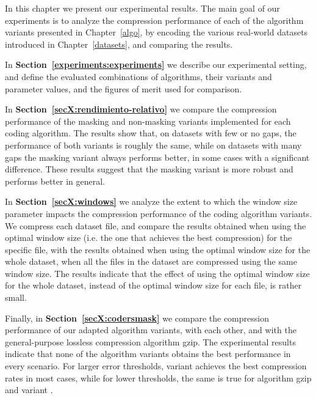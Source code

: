 






In this chapter we present our experimental results. The main goal of our experiments is to analyze the compression performance of each of the algorithm variants presented in Chapter~\ref{algo}, by encoding the various real-world datasets introduced in Chapter~\ref{datasets}, and comparing the results.

In \textbf{Section~\ref{experiments:experiments}} we describe our experimental setting, and define the evaluated combinations of algorithms, their variants and parameter values, and the figures of merit used for comparison. 

In \textbf{Section~\ref{secX:rendimiento-relativo}} we compare the compression performance of the masking and non-masking variants implemented for each coding algorithm. The results show that, on datasets with few or no gaps, the performance of both variants is roughly the same, while on datasets with many gaps the masking variant always performs better, in some cases with a significant difference. These results suggest that the masking variant is more robust and performs better in general. 

In \textbf{Section~\ref{secX:windows}} we analyze the extent to which the window size parameter impacts the compression performance of the coding algorithm variants. We compress each dataset file, and compare the results obtained when using the optimal window size (i.e. the one that achieves the best compression) for the specific file, with the results obtained when using the optimal window size for the whole dataset, when all the files in the dataset are compressed using the same window size. The results indicate that the effect of using the optimal window size for the whole dataset, instead of the optimal window size for each file, is rather small. 

Finally, in \textbf{Section~\ref{secX:codersmask}} we compare the compression performance of our adapted algorithm variants, with each other, and with the general-purpose lossless compression algorithm gzip. The experimental results indicate that none of the algorithm variants obtains the best performance in every scenario. For larger error thresholds, variant  achieves the best compression rates in most cases, while for lower thresholds, the same is true for algorithm gzip and variant .


